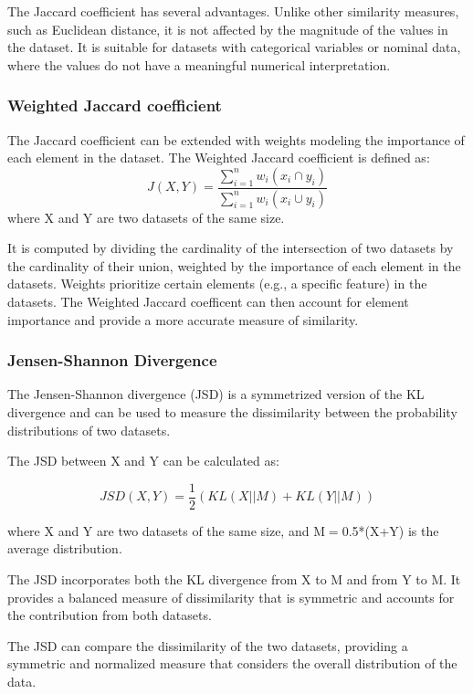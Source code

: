 The Jaccard coefficient has several advantages. Unlike other similarity measures, such as Euclidean distance, it is not affected by the magnitude of the values in the dataset. It is suitable for datasets with categorical variables or nominal data, where the values do not have a meaningful numerical interpretation.

\subsubsection{Weighted Jaccard coefficient}
The Jaccard coefficient can be extended with weights modeling the importance of each element in the dataset.
The Weighted Jaccard coefficient is defined as:\[J(X,Y) = \frac{\sum_{i=1}^{n}w_i(x_i \cap y_i)}{\sum_{i=1}^{n}w_i(x_i \cup y_i)}\]
where X and Y are two datasets of the same size.

It is computed by dividing the cardinality of the intersection of two datasets by the cardinality of their union, weighted by the importance of each element in the datasets. Weights prioritize certain elements (e.g., a specific feature) in the datasets.
The Weighted Jaccard coefficent can then account for element importance and provide a more accurate measure of similarity.

\subsubsection{Jensen-Shannon Divergence}
The Jensen-Shannon divergence (JSD) is a symmetrized version of the KL divergence and can be used to measure the dissimilarity between the probability distributions of two datasets.

The JSD between X and Y can be calculated as:

\[JSD(X, Y) = \frac{1}{2} \left( KL(X || M)
  + KL(Y || M) \right)\]

where X and Y are two datasets of the same size, and M$=$0.5*(X+Y) is the average distribution.

The JSD incorporates both the KL divergence from X to M and from Y to M. It provides a balanced measure of dissimilarity that is symmetric and accounts for the contribution from both datasets.

The JSD can compare the dissimilarity of the two datasets, providing a symmetric and normalized measure that considers the overall distribution of the data.

